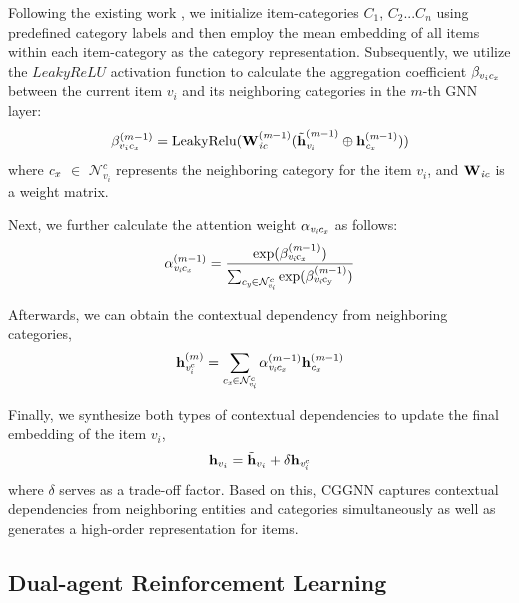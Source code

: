 \documentclass[conference]{IEEEtran}
\begin{document}
Following the existing work \cite{PGPR}, we initialize item-categories $C_1$, $C_2$...$C_n$ using predefined category labels and then employ the mean embedding of all items within each item-category as the category representation. Subsequently, we utilize the $LeakyReLU$ activation function to calculate the aggregation coefficient $\beta_{v_{i}c_{\emph{x}}}$ between the current item $v_i$ and its neighboring  categories in the $m$-th GNN layer:
\begin{equation}
\beta_{v_{i}c_{\emph{x}}}^{(m-1)} = \rm{LeakyRelu}(\textbf{W}_{\emph{ic}}^{(\emph{m}-1)}(\Tilde{\textbf{h}}_{\emph{v}_\emph{i}}^{(\emph{m}-1)} \oplus \textbf{h}_{\emph{c}_\emph{x}}^{(\emph{m}-1)}))
\end{equation}
where $\emph{c}_\emph{x}$ $\in$ $\mathcal{N}_{v_{i}}^c$ represents  the neighboring category for the item $v_i$, 
 and $\textbf{W}_{\emph{ic}}$ is a weight matrix.

Next, we further calculate the attention weight $\alpha_{\emph{v}_{\emph{i}}c_{\emph{x}}}$ as follows:
\begin{equation}
	\alpha_{\emph{v}_{\emph{i}}c_{\emph{x}}}^{(m-1)} = \frac{\rm{exp}(\beta_{\emph{v}_{\emph{i}}c_{\emph{x}}}^{(\emph{m}-1)})}{\sum\nolimits_{c_{\emph{y}} \in  \mathcal{N}^{c}_{\emph{v}_{\emph{i}}}}\rm{exp}(\beta_{\emph{v}_{\emph{i}}c_{\emph{\emph{y}}}}^{(\emph{m}-1)})}
\end{equation}

Afterwards, we can obtain the contextual dependency from  neighboring categories, 
\begin{equation}
	\textbf{h}_{\emph{v}_{\emph{i}}^{c}}^{(m)} = \sum\limits_{c_{\emph{x}} \in  \mathcal{N}^{c}_{\emph{v}_{\emph{i}}}}\alpha_{\emph{v}_{\emph{i}}c_{\emph{x}}}^{(m-1)} \textbf{h}_{\emph{c}_\emph{x}}^{(\emph{m}-1)}
\end{equation}

Finally, we synthesize both types of contextual dependencies to update the final embedding of the item $v_i$,
\begin{equation}
	\textbf{h}_{v_i} = \Tilde{\textbf{h}}_{v_i} + \delta \textbf{h}_{\emph{v}_{\emph{i}}^{c}} 
\end{equation}
where $\delta$ serves as a trade-off factor. Based on this, CGGNN captures contextual dependencies from neighboring entities and categories simultaneously as well as generates a high-order representation for items.


\subsection{Dual-agent Reinforcement Learning}
\end{document}
